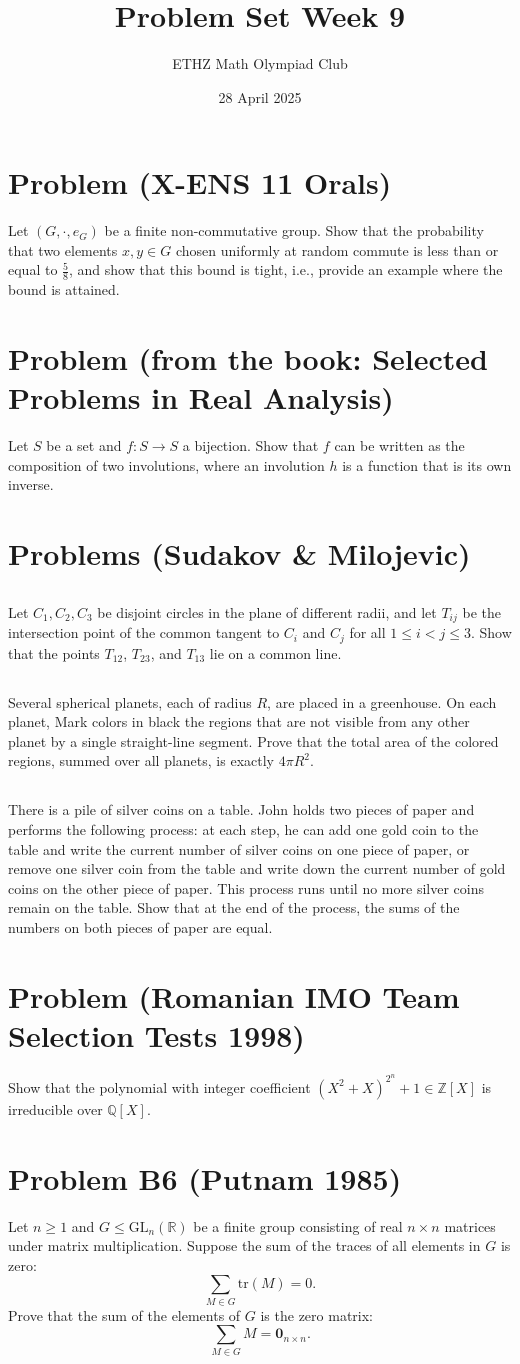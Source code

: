 \documentclass[11pt, a4paper, oneside]{article}
\title{Problem Set Week 9}
\author{ETHZ Math Olympiad Club}
\date{28 April 2025}
\newcommand{\problem}[1][]{\section{#1} \hfill \par}
\theoremstyle{remark}
\theoremstyle{lemma}
\begin{document}
\maketitle
\problem[Problem (X-ENS 11 Orals)]
Let \(\left(G,\cdot,e_G\right)\) be a finite non-commutative group. Show that the probability that two elements \(x,y\in G\) chosen uniformly at random commute is less than or equal to \(\frac{5}{8}\), and show that this bound is tight, i.e., provide an example where the bound is attained.

\problem[Problem (from the book: Selected Problems in Real Analysis)]
Let \( S \) be a set and \( f: S \rightarrow S \) a bijection. Show that \( f \) can be written as the composition of two involutions, where an involution \( h \) is a function that is its own inverse.

\problem[Problems (Sudakov \& Milojevic)]
\subsection{}
Let $C_{1}, C_{2}, C_{3}$ be disjoint circles in the plane of different radii, and let $T_{ij}$ be the intersection point of the common tangent to $C_{i}$ and $C_{j}$ for all $1 \le i < j \le 3$. Show that the points $T_{12}$, $T_{23}$, and $T_{13}$ lie on a common line.

\subsection{}
Several spherical planets, each of radius $R$, are placed in a greenhouse. On each planet, Mark colors in black the regions that are not visible from any other planet by a single straight-line segment. Prove that the total area of the colored regions, summed over all planets, is exactly $4\pi R^{2}$.

 
\subsection{}
There is a pile of silver coins on a table. John holds two pieces of paper and performs the
following process: at each step, he can add one gold coin to the table and write the current number of silver
coins on one piece of paper, or remove one silver coin from the table and write down the current number
of gold coins on the other piece of paper. This process runs until no more silver coins remain on the table.
Show that at the end of the process, the sums of the numbers on both pieces of paper are equal.

\problem[Problem (Romanian IMO Team Selection Tests 1998)]
Show that the polynomial with integer coefficient $(X^2+X)^{2^n}+1\in\mathbb{Z}[X]$ is irreducible over $\mathbb{Q}[X]$.

\problem[Problem B6 (Putnam 1985)]
Let \( n \geq 1 \) and \( G \leq \mathrm{GL}_n(\mathbb{R}) \) be a finite group consisting of real \( n \times n \) matrices under matrix multiplication. Suppose the sum of the traces of all elements in \( G \) is zero:
\[
\sum_{M \in G} \mathrm{tr}(M) = 0.
\]
Prove that the sum of the elements of \( G \) is the zero matrix:
\[
\sum_{M \in G} M = \mathbf{0}_{n \times n}.
\]
\end{document}
